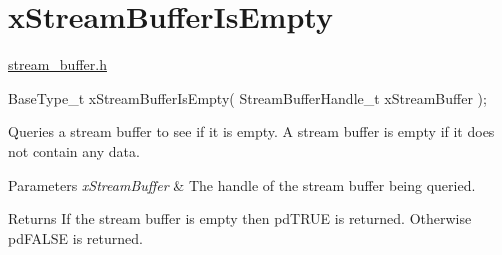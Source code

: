 \hypertarget{group__x_stream_buffer_is_empty}{}\section{x\+Stream\+Buffer\+Is\+Empty}
\label{group__x_stream_buffer_is_empty}
\mbox{\hyperlink{stream__buffer_8h_source}{stream\+\_\+buffer.\+h}}


\begin{DoxyPre}
BaseType\_t xStreamBufferIsEmpty( StreamBufferHandle\_t xStreamBuffer );
\end{DoxyPre}


Queries a stream buffer to see if it is empty. A stream buffer is empty if it does not contain any data.


\begin{DoxyParams}{Parameters}
{\em x\+Stream\+Buffer} & The handle of the stream buffer being queried.\\
\hline
\end{DoxyParams}
\begin{DoxyReturn}{Returns}
If the stream buffer is empty then pd\+T\+R\+UE is returned. Otherwise pd\+F\+A\+L\+SE is returned. 
\end{DoxyReturn}
